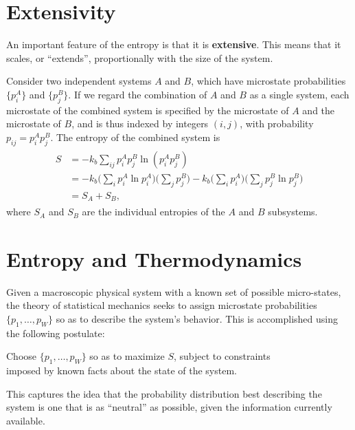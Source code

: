\documentclass[pra,12pt]{revtex4}
\begin{document}
\section{Extensivity}

An important feature of the entropy is that it is \textbf{extensive}.
This means that it scales, or ``extends'', proportionally with the
size of the system.

Consider two independent systems $A$ and $B$, which have microstate
probabilities $\{p_i^A\}$ and $\{p_j^B\}$.  If we regard the
combination of $A$ and $B$ as a single system, each microstate of the
combined system is specified by the microstate of $A$ and the
microstate of $B$, and is thus indexed by integers $(i,j)$, with
probability $p_{ij} = p^A_ip^B_j$.  The entropy of the combined system
is
\begin{align}
  \begin{aligned}
    S &= - k_b \sum_{ij} p_i^Ap^B_j \ln\left(p^A_ip^B_j\right) \\
    &= - k_b \Big(\sum_{i} p^A_i \ln p^A_i\Big)\Big(\sum_j p^B_j\Big)
    - k_b \Big(\sum_{i} p^A_i \Big) \Big(\sum_j p^B_j \ln p^B_j\Big) \\
    &= S_A + S_B,
  \end{aligned}
\end{align}
where $S_A$ and $S_B$ are the individual entropies of the $A$ and $B$
subsystems.

\section{Entropy and Thermodynamics}

Given a macroscopic physical system with a known set of possible
micro-states, the theory of statistical mechanics seeks to assign
microstate probabilities $\{p_1, \dots, p_W\}$ so as to describe the
system's behavior.  This is accomplished using the following
postulate:
\begin{framed}
  \begin{center}
  Choose $\{p_1, \dots, p_W\}$ so as to maximize $S$, subject to
  constraints \\imposed by known facts about the state of the
  system.
  \end{center}
\end{framed}
\vskip -0.15in
\noindent
This captures the idea that the probability distribution best
describing the system is one that is as ``neutral'' as possible, given
the information currently available.
\end{document}

